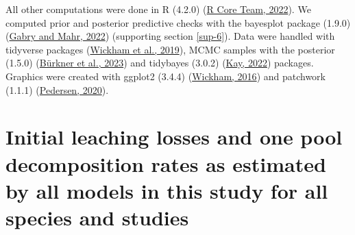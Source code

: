 \documentclass[
  12pt,
]{article}
\begin{document}
All other computations were done in R (4.2.0) (\protect\hyperlink{ref-RCoreTeam.2022}{R Core Team, 2022}). We computed prior and posterior predictive checks with the bayesplot package (1.9.0) (\protect\hyperlink{ref-Gabry.2022}{Gabry and Mahr, 2022}) (supporting section \ref{sup-6}). Data were handled with tidyverse packages (\protect\hyperlink{ref-Wickham.2019}{Wickham et al., 2019}), MCMC samples with the posterior (1.5.0) (\protect\hyperlink{ref-Burkner.2023}{Bürkner et al., 2023}) and tidybayes (3.0.2) (\protect\hyperlink{ref-Kay.2022}{Kay, 2022}) packages. Graphics were created with ggplot2 (3.4.4) (\protect\hyperlink{ref-Wickham.2016}{Wickham, 2016}) and patchwork (1.1.1) (\protect\hyperlink{ref-Pedersen.2020}{Pedersen, 2020}).

\hypertarget{sup-7}{%
\section{Initial leaching losses and one pool decomposition rates as estimated by all models in this study for all species and studies}\label{sup-7}}
\end{document}
